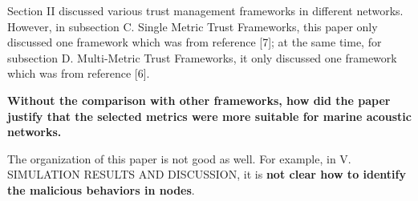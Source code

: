 \documentclass[]{article}
\begin{document}
Section II discussed various trust management frameworks in different networks. 
However, in subsection C. Single Metric Trust Frameworks, this paper only discussed one framework which was from reference [7]; at the same time, for subsection D. Multi-Metric Trust Frameworks, it only discussed one framework which was from reference [6]. 

\textbf{Without the comparison with other frameworks, how did the paper justify that the selected metrics were more suitable for marine acoustic networks.}

The organization of this paper is not good as well. For example, in V. SIMULATION RESULTS AND DISCUSSION, it is \textbf{not clear how to identify the malicious behaviors in nodes}.
\end{document}
